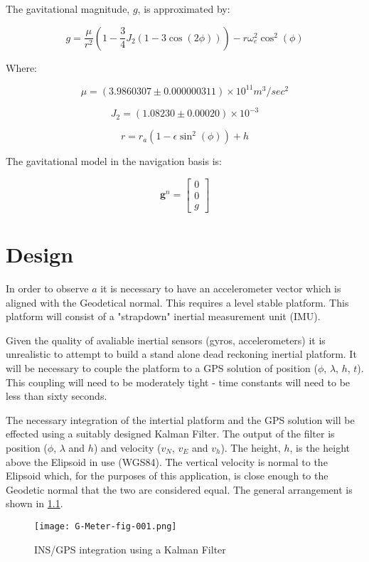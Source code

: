 \documentclass[a4paper]{report}
\numberwithin{equation}{chapter}
\newcommand{\mat}[1]{\boldsymbol{#1}}
\begin{document}
The gavitational magnitude, $g$, is approximated by:

\begin{equation}
g = \frac{\mu}{r^2}\left(1 - \frac{3}{4}J_2\left(1 - 3\cos\left(2\phi\right)\right)\right) - r\omega^2_e\cos^2\left(\phi\right)
\end{equation}

Where:

\begin{equation}
\mu = \left(3.9860307 \pm 0.000000311 \right) \times 10^{11} m^3/sec^2
\end{equation}

\begin{equation}
J_2 = \left(1.08230 \pm 0.00020 \right) \times 10^{-3}
\end{equation}

\begin{equation}
r = r_a \left(1 - \epsilon\sin^2\left(\phi\right)\right) + h
\end{equation}

The gavitational model in the navigation basis is:

\begin{equation}
\mat{g}^n = 
\begin{bmatrix}
0 \\
0 \\
g
\end{bmatrix}
\end{equation}

\clearpage\setcounter{page}{1}
\chapter[Design]{Design}

In order to observe $a$ it is necessary to have an accelerometer vector which is aligned with the Geodetical normal. This requires a level stable platform. This platform will consist of a "strapdown" inertial measurement unit (IMU).

\bigskip

Given the quality of avaliable inertial sensors (gyros, accelerometers) it is unrealistic to attempt to build a stand alone dead reckoning inertial platform. It will be necessary to couple the platform to a GPS solution of position ($\phi$, $\lambda$, $h$, $t$). This coupling will need to be moderately tight - time constants will need to be less than sixty seconds.

\bigskip

The necessary integration of the intertial platform and the GPS solution will be effected using a suitably designed Kalman Filter. The output of the filter is position ($\phi$, $\lambda$ and $h$) and velocity ($v_N$, $v_E$ and $v_h$). The height, $h$, is the height above the Elipsoid in use (WGS84). The vertical velocity is normal to the Elipsoid which, for the purposes of this application, is close enough to the Geodetic normal that the two are considered equal. The general arrangement is shown in \ref{fig:001}.
\begin{figure}
\centering
\texttt{[image: G-Meter-fig-001.png]}
\caption[INS/GPS integration using a Kalman Filter]{INS/GPS integration using a Kalman Filter}
\label{fig:001}
\end{figure}
\end{document}
